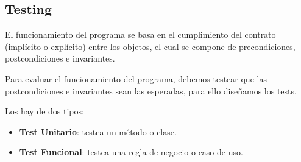 \subsection{Testing}

El funcionamiento del programa se basa en el cumplimiento del contrato (impl\'icito o expl\'icito) entre los objetos, el cual se compone de precondiciones, postcondiciones e invariantes. 

Para evaluar el funcionamiento del programa, debemos testear que las postcondiciones e invariantes sean las esperadas, para ello dise\~namos los tests. 

Los hay de dos tipos: 

\begin{itemize}
 \item \textbf{Test Unitario}: testea un m\'etodo o clase. 
 \item \textbf{Test Funcional}: testea una regla de negocio o caso de uso. 
\end{itemize}

